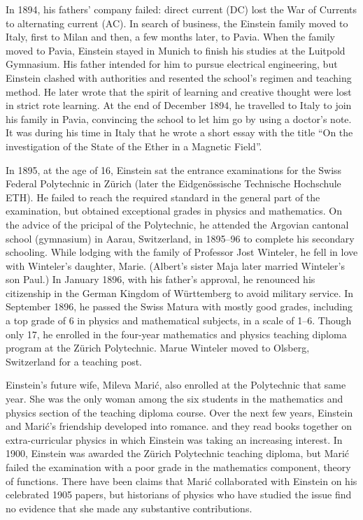 \documentclass[titlepage]{article}
\begin{document}
In 1894, his fathers' company failed: direct current (DC) lost the War of
Currents to alternating current (AC). In search of business, the Einstein
family moved to Italy, first to Milan and then, a few months later, to Pavia.
When the family moved to Pavia, Einstein stayed in Munich to finish his
studies at the Luitpold Gymnasium. His father intended for him to pursue
electrical engineering, but Einstein clashed with authorities and resented
the school's regimen and teaching method. He later wrote that the spirit of
learning and creative thought were lost in strict rote learning. At the end
of December 1894, he travelled to Italy to join his family in Pavia,
convincing the school to let him go by using a doctor's note. It was during
his time in Italy that he wrote a short essay with the title ``On the
investigation of the State of the Ether in a Magnetic Field''.

In 1895, at the age of 16, Einstein sat the entrance examinations for the
Swiss Federal Polytechnic in Z\"{u}rich (later the Eidgen\"{o}ssische
Technische Hochschule ETH). He failed to reach the required standard in
the general part of the examination, but obtained exceptional grades
in physics and mathematics. On the advice of the pricipal of the 
Polytechnic, he attended the Argovian cantonal school (gymnasium) in
Aarau, Switzerland, in 1895--96 to complete his secondary schooling.
While lodging with the family of Professor Jost Winteler, he fell in
love with Winteler's daughter, Marie. (Albert's sister Maja later
married Winteler's son Paul.) In January 1896, with his father's approval,
he renounced his citizenship in the German Kingdom of W\"{u}rttemberg
to avoid military service. In September 1896, he passed the Swiss Matura
with mostly good grades, including a top grade of 6 in physics and 
mathematical subjects, in a scale of 1--6. Though only 17, he enrolled
in the four-year mathematics and physics teaching diploma program at
the Z\"{u}rich Polytechnic. Marue Winteler moved to Olsberg, Switzerland
for a teaching post.

Einstein's future wife, Mileva Mari\'{c}, also enrolled at the Polytechnic
that same year. She was the only woman among the six students in the
mathematics and physics section of the teaching diploma course. Over
the next few years, Einstein and Mari\'{c}'s friendship developed into
romance. and they read books together on extra-curricular physics in
which Einstein was taking an increasing interest. In 1900, Einstein was
awarded the Z\"{u}rich Polytechnic teaching diploma, but Mari\'{c} failed
the examination with a poor grade in the mathematics component, theory of
functions. There have been claims that Mari\'{c} collaborated with Einstein
on his celebrated 1905 papers, but historians of physics who have studied
the issue find no evidence that she made any substantive contributions.
\end{document}
